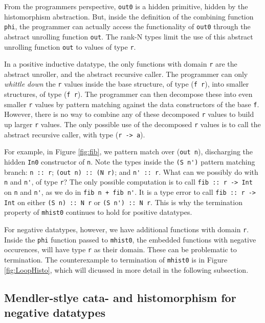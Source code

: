 \documentclass[letterpaper,12pt]{article}
\begin{document}
From the programmers perspective, \verb|out0| is a hidden primitive,
hidden by the histomorphism abstraction.
But, inside the definition of the combining function \verb|phi|,
the programmer can actually access the functionality of \verb|out0|
through the abstract unrolling function \verb|out|. The rank-N types limit
the use of this abstract unrolling function \verb|out| to values of type \verb|r|.

In a positive inductive datatype, the only functions with domain \verb|r|
are the abstract unroller, and the abstract recursive caller.
The programmer can only
{\em whittle down} the \verb|r| values inside the base structure,
of type (\verb|f r|), into smaller structures, of type (\verb|f r|).
The programmer can then decompose these into even smaller \verb|r| values
by pattern matching against the data constructors of the base \verb|f|.
However, there is no way to combine any of these decomposed \verb|r| values
to build up larger \verb|r| values.
The only possible use of the decomposed \verb|r| values is to call
the abstract recursive caller, with type (\verb|r -> a|).

For example,
in Figure \ref{fig:fib}, we pattern match over (\verb|out n|),
discharging the hidden \verb|In0| constructor of \verb|n|.
Note the types inside the \verb|(S n')| pattern matching branch: \verb|n :: r|; \verb|(out n) :: (N r)|; and \verb|n' :: r|.
What can we possibly do with \verb|n| and \verb|n'|, of type \verb|r|?  The only
possible computation is to call
 \verb|fib :: r -> Int| on \verb|n| and \verb|n'|,  as we do in \verb|fib n + fib n'|.
It is a type error to call \verb|fib :: r -> Int| on either \verb|(S n) :: N r|
or \verb|(S n') :: N r|. This is why the termination property of \verb|mhist0| continues to hold for
positive datatypes.


For negative datatypes, however,
we have additional functions with domain \verb|r|.
Inside the \verb|phi| function passed to \verb|mhist0|,
the embedded functions with negative occurences,
will have type \verb|r| as their domain.
These can be problematic to termination.
The counterexample to termination of \verb|mhist0|
is in Figure \ref{fig:LoopHisto}, which will dicussed in more detail
in the following subsection.

\subsection{Mendler-stlye cata- and histomorphism for negative datatypes}
\label{sec:bg:neg}
\end{document}
